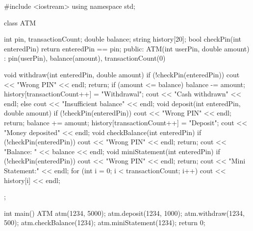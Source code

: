 \begin{code}
#include <iostream>
using namespace std;

class ATM {
    int pin, transactionCount; double balance; string history[20];
    bool checkPin(int enteredPin) { return enteredPin == pin; }
public:
    ATM(int userPin, double amount) : pin(userPin), balance(amount), transactionCount(0) {}

    void withdraw(int enteredPin, double amount) {
        if (!checkPin(enteredPin)) { cout << "Wrong PIN" << endl; return; }
        if (amount <= balance) { balance -= amount; history[transactionCount++] = "Withdrawal"; cout << "Cash withdrawn" << endl; }
        else cout << "Insufficient balance" << endl;
    }
    void deposit(int enteredPin, double amount) {
        if (!checkPin(enteredPin)) { cout << "Wrong PIN" << endl; return; }
        balance += amount; history[transactionCount++] = "Deposit"; cout << "Money deposited" << endl;
    }
    void checkBalance(int enteredPin) {
        if (!checkPin(enteredPin)) { cout << "Wrong PIN" << endl; return; }
        cout << "Balance: " << balance << endl;
    }
    void miniStatement(int enteredPin) {
        if (!checkPin(enteredPin)) { cout << "Wrong PIN" << endl; return; }
        cout << "Mini Statement:" << endl;
        for (int i = 0; i < transactionCount; i++) cout << history[i] << endl;
    }
};

int main() {
    ATM atm(1234, 5000);
    atm.deposit(1234, 1000); atm.withdraw(1234, 500);
    atm.checkBalance(1234); atm.miniStatement(1234);
    return 0;
}
\end{code}

\outputlabel
{}


